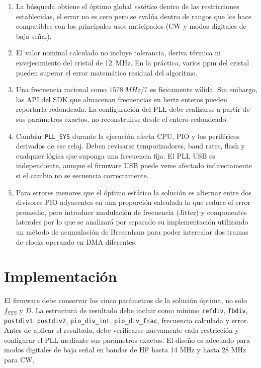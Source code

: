 \documentclass[11pt,a4paper]{article}
\begin{document}
\begin{enumerate}[leftmargin=*]
 \item La búsqueda obtiene el óptimo global \emph{estático} dentro de las
 restricciones establecidas, el error no es cero pero se evalúa dentro de rangos
 que los hace compatibles con los principales usos anticipados (CW y modos digitales
 de baja señal).
 \item El valor nominal calculado no incluye tolerancia, deriva térmica ni
 envejecimiento del cristal de \SI{12}{MHz}. En la práctica, varios ppm del
 cristal pueden superar el error matemático residual del algoritmo.
 \item Una frecuencia racional como \(\SI{1578}{MHz}/7\) es físicamente válida.
 Sin embargo, las API del SDK que almacenan frecuencias en hertz enteros pueden
 reportarla redondeada. La configuración del PLL debe realizarse a partir de
 sus parámetros exactos, no reconstruirse desde el entero redondeado.
 \item Cambiar \texttt{PLL\_SYS} durante la ejecución afecta CPU, PIO y los
 periféricos derivados de ese reloj. Deben revisarse temporizadores, baud rates,
 flash y cualquier lógica que suponga una frecuencia fija. El PLL USB es
 independiente, aunque el firmware USB puede verse afectado indirectamente si
 el cambio no se secuencia correctamente.
 \item Para errores menores que el óptimo estático la solución es alternar entre dos
 divisores PIO adyacentes en una proporción calculada lo que reduce el error
 promedio, pero introduce modulación de frecuencia (Jitter) y componentes laterales por
 lo que se analizará por separado su implementación utilizando un método de 
 acumulación de  Bresenham para poder intercalar dos tramas de clocks operando en 
 DMA diferentes.
\end{enumerate}

\section{Implementación}

El firmware debe conservar los cinco parámetros de la solución óptima, no
solo \(f_{\mathrm{SYS}}\) y \(D\). La estructura de resultado debe incluir como
mínimo \texttt{refdiv}, \texttt{fbdiv}, \texttt{postdiv1}, \texttt{postdiv2},
\texttt{pio\_div\_int}, \texttt{pio\_div\_frac}, frecuencia calculada y error.
Antes de aplicar el resultado, debe verificarse nuevamente cada restricción y
configurar el PLL mediante sus parámetros exactos.
El diseño es adecuado para modos digitales de baja señal en bandas de HF hasta
14 MHz y hasta 28 MHz para CW.
\end{document}
